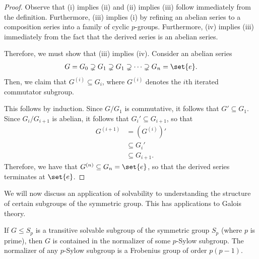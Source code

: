 \documentclass[10pt]{mypackage}
\begin{document}
\begin{proof}
  Observe that (i) implies (ii) and (ii) implies (iii) follow immediately from the definition. Furthermore, (iii) implies (i) by refining an abelian series to a composition series into a family of cyclic $p$-groups. Furthermore, (iv) implies (iii) immediately from the fact that the derived series is an abelian series.

  Therefore, we must show that (iii) implies (iv). Consider an abelian series
  \begin{align*}
    G = G_0\supsetneq G_1\supsetneq G_1\supsetneq \cdots \supsetneq G_n = \set{e}.
  \end{align*}
  Then, we claim that $G^{(i)}\subseteq G_i$, where $G^{(i)}$ denotes the $i$th iterated commutator subgroup.

  This follows by induction. Since $G/G_1$ is commutative, it follows that $G'\subseteq G_1$. Since $G_i/G_{i+1}$ is abelian, it follows that $G_i'\subseteq G_{i+1}$, so that
  \begin{align*}
    G^{(i+1)} &= \left( G^{(i)} \right)'\\
              &\subseteq G_i'\\
              &\subseteq G_{i+1}.
  \end{align*}
  Therefore, we have that $G^{(n)}\subseteq G_n = \set{e}$, so that the derived series terminates at $\set{e}$.
\end{proof}
We will now discuss an application of solvability to understanding the structure of certain subgroups of the symmetric group. This has applications to Galois theory.
\begin{proposition}
  If $G\leq S_p$ is a transitive solvable subgroup of the symmetric group $S_p$ (where $p$ is prime), then $G$ is contained in the normalizer of some $p$-Sylow subgroup. The normalizer of any $p$-Sylow subgroup is a Frobenius group of order $p\left( p-1 \right)$.
\end{proposition}
\end{document}
